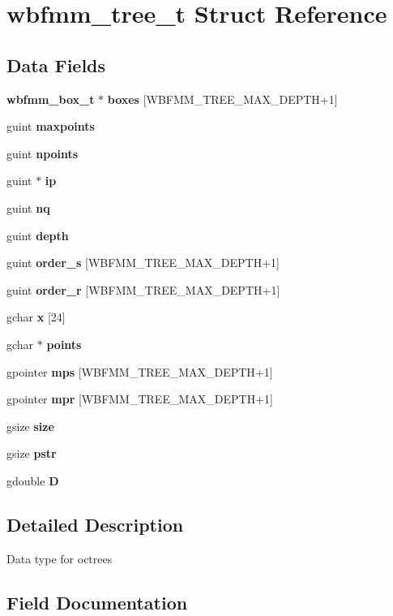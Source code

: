 \section{wbfmm\+\_\+tree\+\_\+t Struct Reference}
\label{structwbfmm__tree__t}
\subsection*{Data Fields}
\begin{DoxyCompactItemize}
\item 
{\bf wbfmm\+\_\+box\+\_\+t} $\ast$ {\bf boxes} [W\+B\+F\+M\+M\+\_\+\+T\+R\+E\+E\+\_\+\+M\+A\+X\+\_\+\+D\+E\+P\+T\+H+1]
\item 
guint {\bf maxpoints}
\item 
guint {\bf npoints}
\item 
guint $\ast$ {\bf ip}
\item 
guint {\bf nq}
\item 
guint {\bf depth}
\item 
guint {\bf order\+\_\+s} [W\+B\+F\+M\+M\+\_\+\+T\+R\+E\+E\+\_\+\+M\+A\+X\+\_\+\+D\+E\+P\+T\+H+1]
\item 
guint {\bf order\+\_\+r} [W\+B\+F\+M\+M\+\_\+\+T\+R\+E\+E\+\_\+\+M\+A\+X\+\_\+\+D\+E\+P\+T\+H+1]
\item 
gchar {\bf x} [24]
\item 
gchar $\ast$ {\bf points}
\item 
gpointer {\bf mps} [W\+B\+F\+M\+M\+\_\+\+T\+R\+E\+E\+\_\+\+M\+A\+X\+\_\+\+D\+E\+P\+T\+H+1]
\item 
gpointer {\bf mpr} [W\+B\+F\+M\+M\+\_\+\+T\+R\+E\+E\+\_\+\+M\+A\+X\+\_\+\+D\+E\+P\+T\+H+1]
\item 
gsize {\bf size}
\item 
gsize {\bf pstr}
\item 
gdouble {\bf D}
\end{DoxyCompactItemize}


\subsection{Detailed Description}
Data type for octrees 

\subsection{Field Documentation}
